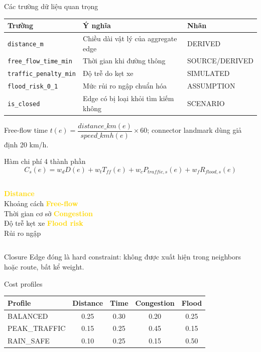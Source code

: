 \documentclass[aspectratio=169,11pt]{beamer}
\newcommand{\key}[1]{\textcolor{gold}{\textbf{#1}}}
\newcommand{\smallnote}[1]{\vspace{0.08cm}{\scriptsize\textcolor{muted}{#1}}}
\begin{document}
\begin{frame}{Các trường dữ liệu quan trọng}
\begin{tabularx}{\textwidth}{l X l}
\toprule
Trường & Ý nghĩa & Nhãn\\
\midrule
\texttt{distance\_m} & Chiều dài vật lý của aggregate edge & DERIVED\\
\texttt{free\_flow\_time\_min} & Thời gian khi đường thông & SOURCE/DERIVED\\
\texttt{traffic\_penalty\_min} & Độ trễ do kẹt xe & SIMULATED\\
\texttt{flood\_risk\_0\_1} & Mức rủi ro ngập chuẩn hóa & ASSUMPTION\\
\texttt{is\_closed} & Edge có bị loại khỏi tìm kiếm không & SCENARIO\\
\bottomrule
\end{tabularx}
\vspace{5mm}
\begin{block}{Free-flow time}
\centering $t(e)=\dfrac{distance\_km(e)}{speed\_kmh(e)}\times 60$; connector landmark dùng giả định 20 km/h.
\end{block}
\end{frame}

\begin{frame}{Hàm chi phí 4 thành phần}
\begin{equation*}
C_s(e)=w_dD(e)+w_tT_{ff}(e)+w_cP_{traffic,s}(e)+w_fR_{flood,s}(e)
\end{equation*}
\begin{columns}[T]
\centering\key{Distance}\\Khoảng cách
\centering\key{Free-flow}\\Thời gian cơ sở
\centering\key{Congestion}\\Độ trễ kẹt xe
\centering\key{Flood risk}\\Rủi ro ngập
\end{columns}
\vfill
\begin{alertblock}{Closure}
Edge đóng là hard constraint: không được xuất hiện trong neighbors hoặc route, bất kể weight.
\end{alertblock}
\end{frame}

\begin{frame}{Cost profiles}
\begin{center}
\begin{tabular}{lcccc}
\toprule
Profile & Distance & Time & Congestion & Flood\\
\midrule
BALANCED & 0.25 & 0.30 & 0.20 & 0.25\\
PEAK\_TRAFFIC & 0.15 & 0.25 & 0.45 & 0.15\\
RAIN\_SAFE & 0.10 & 0.25 & 0.15 & 0.50\\
\bottomrule
\end{tabular}
\end{center}
\vfill
\smallnote{Các weight là hệ số ưu tiên của prototype, không phải phần trăm đóng góp vì các thành phần khác đơn vị và scale.}
\end{frame}
\end{document}
